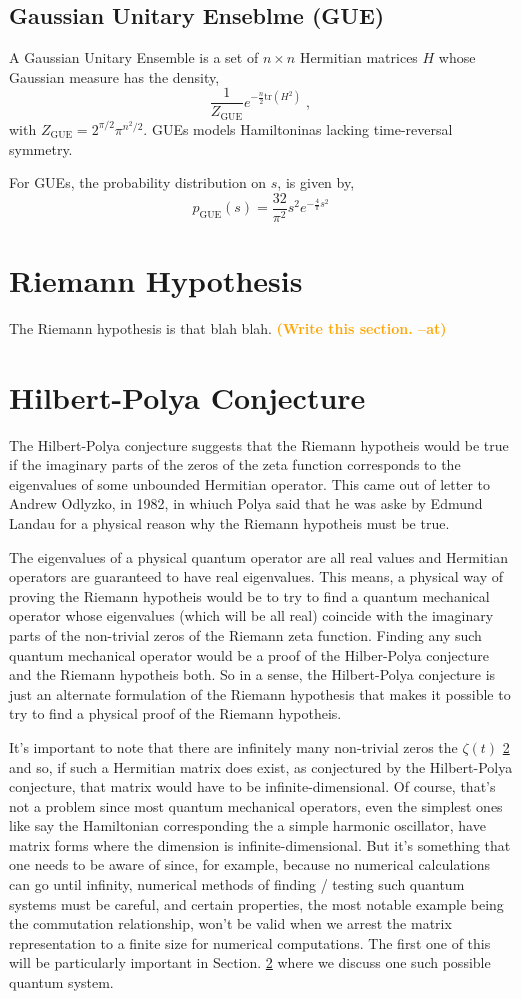 \documentclass{amsproc}
\newcommand{\at}[1]{\textbf{\textcolor{orange}{(#1 --at)}}}
\theoremstyle{definition}
\theoremstyle{remark}
\numberwithin{equation}{section}
\begin{document}
\subsection{Gaussian Unitary Enseblme (GUE)}
A Gaussian Unitary Ensemble is a set of $n \times n$ Hermitian matrices $H$ whose Gaussian measure has the density, 
$$
\frac{1}{Z_{\mathrm{GUE}}} e^{ - \frac{n}{2} \mathrm{tr}(H^2) } \;,
$$
with $Z_{\mathrm{GUE}} = 2^{ \pi / 2} \pi^{n^2 / 2}$. GUEs models Hamiltoninas lacking time-reversal symmetry. 

For GUEs, the probability distribution on $s$, is given by, 
$$
p_{\mathrm{GUE}}(s) = \frac{32}{\pi^2} s^2 e^{- \frac{4}{\pi} s^2 }
$$

\section{Riemann Hypothesis}
The Riemann hypothesis is that blah blah. \at{Write this section.}

\section{Hilbert-Polya Conjecture}
The Hilbert-Polya conjecture suggests that the Riemann hypotheis would be true if the imaginary parts of the zeros of the zeta function corresponds to the eigenvalues of some unbounded Hermitian operator. This came out of  letter to Andrew Odlyzko, in 1982, in whiuch Polya said that he was aske by Edmund Landau for a physical reason why the Riemann hypotheis must be true. 

The eigenvalues of a physical quantum operator are all real values and Hermitian operators are guaranteed to have real eigenvalues. This means, a physical way of proving the Riemann hypotheis would be to try to find a quantum mechanical operator whose eigenvalues (which will be all real) coincide with the imaginary parts of the non-trivial zeros of the Riemann zeta function. Finding any such quantum mechanical operator would be a proof of the Hilber-Polya conjecture and the Riemann hypotheis both. So in a sense, the Hilbert-Polya conjecture is just an alternate formulation of the Riemann hypothesis that makes it possible to try to find a physical proof of the Riemann hypotheis. 


It's important to note that there are infinitely many non-trivial zeros the $\zeta(t)$ \ref{} and so, if such a Hermitian matrix does exist, as conjectured by the Hilbert-Polya conjecture, that matrix would have to be infinite-dimensional. Of course, that's not a problem since most quantum mechanical operators, even the simplest ones like say the Hamiltonian corresponding the a simple harmonic oscillator, have matrix forms where the dimension is infinite-dimensional. But it's something that one needs to be aware of since, for example, because no numerical calculations can go until infinity, numerical methods of finding / testing such quantum systems must be careful, and certain properties, the most notable example being the commutation relationship, won't be valid when we arrest the matrix representation to a finite size for numerical computations. The first one of this will be particularly important in Section. \ref{} where we discuss one such possible quantum system. 
\end{document}
